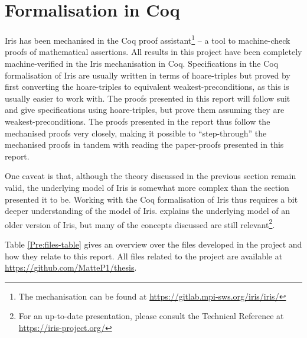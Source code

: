 \documentclass[a4paper, 10pt]{report}
\theoremstyle{definition}
\begin{document}
\section{Formalisation in Coq}
\label{Pre:section:coq}

Iris has been mechanised in the Coq proof assistant\footnote{The mechanisation can be found at \url{https://gitlab.mpi-sws.org/iris/iris/}} -- a tool to machine-check proofs of mathematical assertions. All results in this project have been completely machine-verified in the Iris mechanisation in Coq. Specifications in the Coq formalisation of Iris are usually written in terms of hoare-triples but proved by first converting the hoare-triples to equivalent weakest-preconditions, as this is usually easier to work with. The proofs presented in this report will follow suit and give specifications using hoare-triples, but prove them assuming they are weakest-preconditions. The proofs presented in the report thus follow the mechanised proofs very closely, making it possible to ``step-through'' the mechanised proofs in tandem with reading the paper-proofs presented in this report.

One caveat is that, although the theory discussed in the previous section remain valid, the underlying model of Iris is somewhat more complex than the section presented it to be. Working with the Coq formalisation of Iris thus requires a bit deeper understanding of the model of Iris. \cite{DBLP:journals/jfp/JungKJBBD18} explains the underlying model of an older version of Iris, but many of the concepts discussed are still relevant\footnote{For an up-to-date presentation, please consult the Technical Reference at \url{https://iris-project.org/}}.

Table \ref{Pre:files-table} gives an overview over the files developed in the project and how they relate to this report. All files related to the project are available at \url{https://github.com/MatteP1/thesis}.
\end{document}
